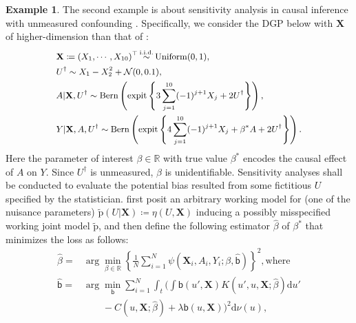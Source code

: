 \documentclass{article}
\def\calN{\mathcal{N}}
\def\sfb{\mathsf{b}}
\def\sfb{\mathsf{b}}
\def\bfX{\mathbf{X}}
\def\expit{\mathrm{expit}}
\theoremstyle{plain}
\theoremstyle{definition}
\newtheorem{example}[theorem]{Example}
\theoremstyle{remark}
\def\diff{\mathrm{d}}
\def\hat{\widehat}
\def\tilde{\widetilde}
\def\p{\mathrm{p}}
\def\bbR{\mathbb{R}}
\begin{document}
\begin{example}
The second example is about sensitivity analysis in causal inference with unmeasured confounding \citep{robins2000sensitivity}. Specifically, we consider the DGP below with $\bfX$ of higher-dimension than that of \citet{zhang2022semi}:
\begin{equation}
\small
\label{model-sens}
\begin{split}
& \bfX \coloneqq (X_{1}, \cdots, X_{10})^{\top} \mathop{\sim}\limits^{\text{i.i.d.}} \text{Uniform} (0, 1), \\
& U^{\dag} \sim X_1 - X_2 ^2 + \calN (0, 0.1), \\
& A | \bfX, U^{\dag} \sim \text{Bern} \left( \expit \left\{ 3 \sum_{j=1}^{10} (-1)^{j+1}X_{j} + 2 U^{\dag} \right\} \right), \\
& Y | \bfX, A, U^{\dag} \sim \text{Bern} \left( \expit \left\{ 4 \sum_{j=1}^{10}(-1)^{j+1}X_{j} + \beta^\ast A + 2 U^{\dag} \right\} \right).
\end{split}
\end{equation}
Here the parameter of interest $\beta \in \mathbb{R}$ with true value $\beta^\ast$ encodes the causal effect of $A$ on $Y$. Since $U^{\dag}$ is unmeasured, $\beta$ is unidentifiable. Sensitivity analyses shall be conducted to evaluate the potential bias resulted from some fictitious $U$ specified by the statistician. \citet{zhang2022semi} first posit an arbitrary working model for (one of the nuisance parameters) $\tilde{\p} (U | \bfX) \coloneqq \eta (U, \bfX)$ inducing a possibly misspecified working joint model $\tilde{\p}$, and then define the following estimator $\hat{\beta}$ of $\beta^{\ast}$ that minimizes the loss as follows:
\begin{equation}
\begin{split}
\hat{\beta} = & \arg\min_{\beta \in \bbR} \left\{ \frac{1}{N} \sum_{i = 1}^{N} \psi (\bfX_{i}, A_{i}, Y_{i}; \beta, \hat{\sfb}) \right\}^2, \text{where}\\
\hat{\sfb} = & \arg\min_{\sfb} \sum_{i=1}^N \int_{t} \Bigg(\int \mathsf{b} (u', \bfX) K (u', u, \bfX; \hat{\beta}) \diff u' \\
& \quad \quad - C (u, \bfX; \hat{\beta}) + \lambda \mathsf{b} (u, \bfX) \Bigg)^2 \diff \nu(u),
\end{split}
\label{sen_eq1}
\end{equation}

\end{example}
\end{document}
